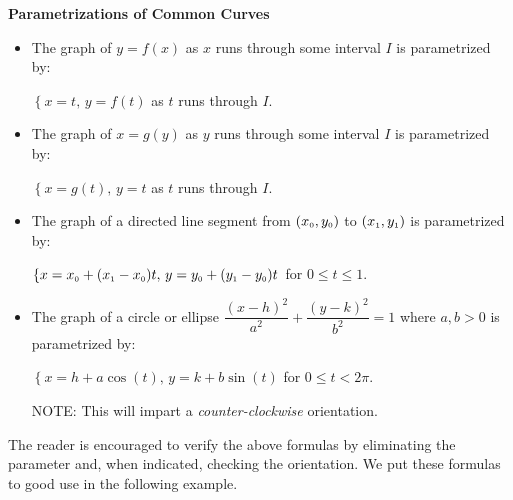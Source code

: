 \documentclass{ximera}
\begin{document}
\colorbox{ResultColor}{\bbm

\label{commonparametrizations}


\centerline{\textbf{Parametrizations of Common Curves}}

\begin{itemize}

\item  The graph of  $y=f(x)$ as $x$ runs through some interval $I$ is parametrized by:

$\left\{ x = t, \, y = f(t) \right.$ as  $t$ runs through $I$.

\item  The graph of  $x=g(y)$ as $y$ runs through some interval $I$ is parametrized by:

$\left\{ x = g(t), \, y = t \right.$ as  $t$ runs through $I$.

\item  The graph of a  directed line segment from $(x_{\text{\tiny$0$}}, y_{\text{\tiny$0$}})$ to $(x_{\text{\tiny$1$}}, y_{\text{\tiny$1$}})$ is parametrized by:

$\left\{ x  = x_{\text{\tiny$0$}} + (x_{\text{\tiny$1$}} - x_{\text{\tiny$0$}}) t, \, y = y_{\text{\tiny$0$}} + (y_{\text{\tiny$1$}} - y_{\text{\tiny$0$}}) t \right.$  for $0 \leq t \leq 1$.



\item  The graph of a circle or ellipse $\dfrac{(x-h)^2}{a^2} + \dfrac{(y-k)^2}{b^2} = 1$ where $a,b > 0$ is parametrized by:

$\left\{ x =  h+a\cos(t), \, y = k+b\sin(t) \right.$  for $0 \leq t < 2\pi$. 

NOTE:  This will impart a \textit{counter-clockwise} orientation.

\end{itemize}

\smallskip

\ebm}

\smallskip

The reader is encouraged to verify the above formulas by eliminating the parameter and, when indicated, checking the orientation.  We put these formulas to good use in the following example.
\end{document}
